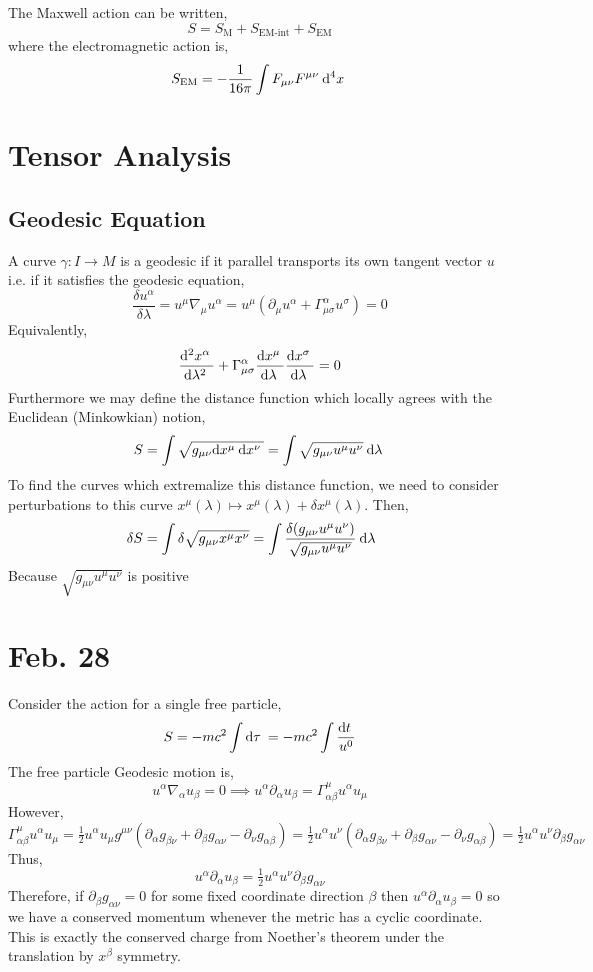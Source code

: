 \documentclass[11pt, a4paper]{article}
\begin{document}
\begin{definition}
The Maxwell action can be written,
\[ S = S_{\text{M}} + S_{\text{EM-int}} + S_{\text{EM}} \]
where the electromagnetic action is,
\[ S_{\text{EM}} = - \frac{1}{16 \pi} \int F_{\mu \nu} F^{\mu \nu} \: \mathrm{d}^{4} x \: \]
\end{definition}

\section{Tensor Analysis}


\subsection{Geodesic Equation}

A curve $\gamma : I \to M$ is a geodesic if it parallel transports its own tangent vector $u$ i.e. if it satisfies the geodesic equation,
\[ \frac{\delta u^\alpha}{\delta \lambda} = u^\mu \nabla_\mu u^\alpha = u^\mu \left( \partial_\mu u^\alpha + \Gamma^\alpha_{\mu \sigma} u^\sigma \right) = 0 \]
Equivalently,
\[ \frac{\mathrm{d}^{2} x^\alpha \:}{\mathrm{d}\lambda^{2} \:} + \Gamma^\alpha_{\mu \sigma} \frac{\mathrm{d}x^\mu \:}{\mathrm{d}\lambda \:} \frac{\mathrm{d}x^\sigma \:}{\mathrm{d}\lambda \:} = 0 \]
Furthermore we may define the distance function which locally agrees with the Euclidean (Minkowkian) notion,
\[ S = \int \sqrt{g_{\mu \nu} \mathrm{d}x^\mu \: \mathrm{d}x^\nu \:} = \int \sqrt{g_{\mu \nu} u^\mu u^\nu} \: \mathrm{d}\lambda \: \]
To find the curves which extremalize this distance function, we need to consider perturbations to this curve $x^\mu(\lambda) \mapsto x^\mu(\lambda) + \delta x^\mu(\lambda)$. Then,
\begin{align*}
\delta S &= \int \delta \sqrt{g_{\mu \nu} x^\mu x^\nu} = \int \frac{\delta(g_{\mu \nu} u^\mu u^\nu)}{\sqrt{g_{\mu \nu} u^\mu u^\nu}} \: \mathrm{d}\lambda \: 
\end{align*}
Because $\sqrt{g_{\mu \nu} u^\mu u^\nu}$ is positive

\section{Feb. 28}

Consider the action for a single free particle,
\[ S = - mc^2 \int \mathrm{d}\tau \: = - mc^2 \int \frac{\mathrm{d}t \:}{u^0} \]
The free particle Geodesic motion is,
\[ u^\alpha \nabla_\alpha u_\beta = 0 \implies u^\alpha\partial_\alpha u_\beta = \Gamma^\mu_{\alpha \beta} u^\alpha u_\mu \]
However,
\[ \Gamma^{\mu}_{\alpha \beta} u^\alpha u_\mu = \tfrac{1}{2} u^\alpha u_\mu g^{\mu \nu} \left( \partial_\alpha g_{\beta \nu} + \partial_{\beta} g_{\alpha \nu} - \partial_\nu g_{\alpha \beta} \right) = \tfrac{1}{2} u^\alpha u^\nu \left( \partial_\alpha g_{\beta \nu} + \partial_{\beta} g_{\alpha \nu} - \partial_\nu g_{\alpha \beta} \right) = \tfrac{1}{2} u^\alpha u^\nu \partial_\beta g_{\alpha \nu} \]
Thus,
\[ u^\alpha\partial_\alpha u_\beta = \tfrac{1}{2} u^\alpha u^\nu \partial_\beta g_{\alpha \nu} \]
Therefore, if $\partial_\beta g_{\alpha \nu} = 0$ for some fixed coordinate direction $\beta$ then $u^\alpha \partial_\alpha u_\beta = 0$ so we have a conserved momentum whenever the metric has a cyclic coordinate. This is exactly the conserved charge from Noether's theorem under the translation by $x^\beta$ symmetry. 
\end{document}
